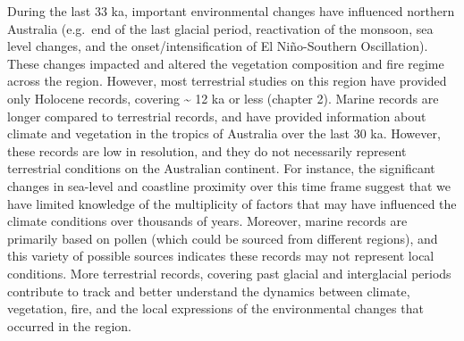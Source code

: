 \documentclass[
  12pt,
]{book}
\begin{document}
During the last 33 ka, important environmental changes have influenced northern Australia (e.g.~end of the last glacial period, reactivation of the monsoon, sea level changes, and the onset/intensification of El Niño-Southern Oscillation). These changes impacted and altered the vegetation composition and fire regime across the region. However, most terrestrial studies on this region have provided only Holocene records, covering \textasciitilde{} 12 ka or less (chapter 2). Marine records are longer compared to terrestrial records, and have provided information about climate and vegetation in the tropics of Australia over the last 30 ka. However, these records are low in resolution, and they do not necessarily represent terrestrial conditions on the Australian continent. For instance, the significant changes in sea-level and coastline proximity over this time frame suggest that we have limited knowledge of the multiplicity of factors that may have influenced the climate conditions over thousands of years. Moreover, marine records are primarily based on pollen (which could be sourced from different regions), and this variety of possible sources indicates these records may not represent local conditions. More terrestrial records, covering past glacial and interglacial periods contribute to track and better understand the dynamics between climate, vegetation, fire, and the local expressions of the environmental changes that occurred in the region.
\end{document}
